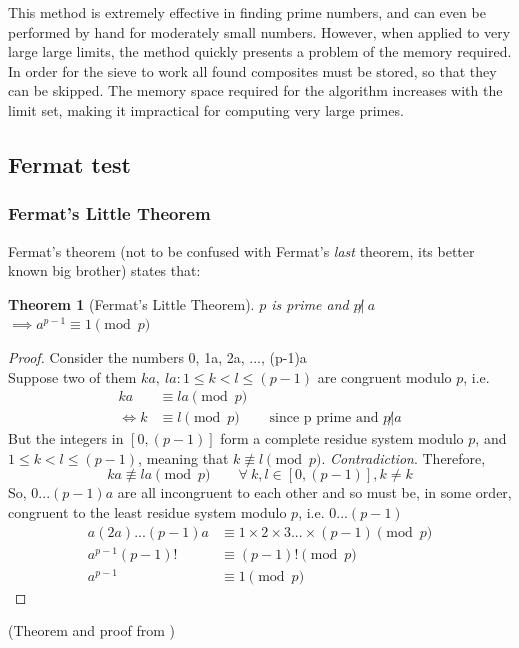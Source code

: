 \documentclass[12pt, titlepage]{article}
\newtheorem{theorem}{Theorem}
\begin{document}
    This method is extremely effective in finding prime numbers, and can even be performed
    by hand for moderately small numbers. However, when applied to very large large limits,
    the method quickly presents a problem of the memory required. In order for the sieve to
    work all found composites must be stored, so that they can be skipped. The memory space
    required for the algorithm increases with the limit set, making it impractical for
    computing very large primes.

           
    \subsection{Fermat test}
    \label{sec:fermat}

        \subsubsection{Fermat's Little Theorem}
        Fermat's theorem (not to be confused with Fermat's \emph{last} theorem, its better known
        big brother) states that:
        \begin{theorem}[Fermat's Little Theorem]
            $p$ is prime and $p \not|\ a$ $\implies a^{p-1} \equiv 1 \pmod{p}$
        \end{theorem}

        \begin{proof}
            Consider the numbers 0, 1a, 2a, ..., (p-1)a\\
            Suppose two of them $ka,\ la: 1\leq k < l \leq (p-1)$ are congruent modulo $p$, i.e.        %
            \begin{align*}
                      ka &\equiv la \pmod{p}\\
                \iff  k  &\equiv l  \pmod{p} &&\text{since p prime and $p \not| a$}
            \end{align*}
            But the integers in $[0, (p-1)]$ form a complete residue system modulo $p$, and  $1
            \leq k<l \leq (p-1)$, meaning that $k \not\equiv l \pmod p$. \emph{Contradiction}.
            Therefore,
            \begin{equation*}
                ka \not\equiv la \pmod{p}\qquad \forall\ k,l \in [0, (p-1)], k \not= k
            \end{equation*}
            So, $0...(p-1)a$ are all incongruent to each other and so must be, in some order,
            congruent to the least residue system modulo $p$, i.e.  $0...(p-1)$
            \begin{align*}
                a(2a)...(p-1)a &\equiv 1\times 2\times 3...\times (p-1) \pmod{p}\\
                a^{p-1}(p-1)!  &\equiv (p-1)!                           \pmod{p}\\
                a^{p-1}        &\equiv 1                                \pmod{p}
            \end{align*}
        \end{proof}
        (Theorem and proof from \cite[109]{dence})
\end{document}

